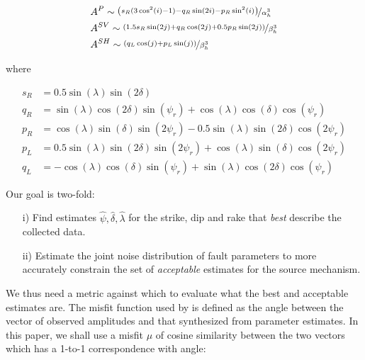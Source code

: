 \documentclass[preprint]{seismica}
\begin{document}
     \begin{align} \label{eq:eq1}
         \nonumber &A^P \sim \nicefrac{\left( s_R(3\cos^2(i) - 1) - q_R\sin(2i) - p_R\sin^2(i)\right)}{\alpha_h^3}\\
         &A^{SV} \sim \nicefrac{\left( 1.5 s_R\sin(2j) + q_R\cos(2j) + 0.5 p_R\sin(2j) \right)}{\beta_h^3}\\
         \nonumber &A^{SH} \sim \nicefrac{\left( q_L\cos(j) + p_L\sin(j) \right)}{\beta_h^3}
     \end{align}

     where

     \begin{align} \label{eq:eq2}
         \nonumber s_R &= 0.5 \sin(\lambda) \sin(2\delta)\\
         \nonumber q_R &= \sin(\lambda) \cos(2\delta) \sin(\psi_r) + \cos(\lambda) \cos(\delta) \cos(\psi_r)\\
         p_R &= \cos(\lambda) \sin(\delta) \sin(2\psi_r) - 0.5\sin(\lambda) \sin(2\delta) \cos(2\psi_r)\\
         \nonumber p_L &= 0.5\sin(\lambda) \sin(2\delta) \sin(2\psi_r) + \cos(\lambda) \sin(\delta) \cos(2\psi_r)\\
         \nonumber q_L &= -\cos(\lambda) \cos(\delta) \sin(\psi_r) + \sin(\lambda) \cos(2\delta) \cos(\psi_r)
     \end{align}

     Our goal is two-fold:
     \begin{enumerate}
         \item [i)]
            Find estimates $\widehat{\psi}, \widehat{\delta}, \widehat{\lambda}$ for the strike, dip
            and rake that \textit{best} describe the collected data.

        \item [ii)]
            Estimate the joint noise distribution of fault parameters to more accurately constrain the
            set of \textit{acceptable} estimates for the source mechanism.
            
     \end{enumerate}

     We thus need a metric against which to evaluate what the best and acceptable estimates are. The
     misfit function used by \citet{sita_potential_2022} is defined as the angle between the vector of
     observed amplitudes and that synthesized from parameter estimates. In this paper, we shall use a
     misfit $\mu$ of cosine similarity between the two vectors which has a 1-to-1 correspondence with angle:
\end{document}
